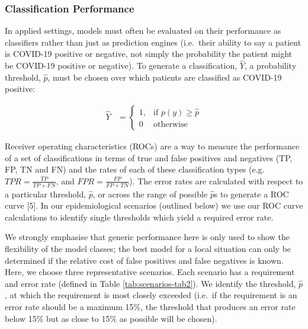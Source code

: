 \documentclass[]{elsarticle} %
\begin{document}
\hypertarget{classification-performance}{%
\subsubsection{Classification Performance}\label{classification-performance}}

In applied settings, models must often be evaluated on their performance as classifiers rather than just as prediction engines (i.e.~their ability to say a patient is COVID-19 positive or negative, not simply the probability the patient might be COVID-19 positive or negative).
To generate a classification, \(\hat{Y}\), a probability threshold, \(\hat{p}\), must be chosen over which patients are classified as COVID-19 positive:

\begin{equation}\begin{aligned}
\hat{Y} &= \begin{cases}
    1,& \text{if } p(y) \geq \hat{p} \\
     0  & \text{otherwise}
\end{cases}
\label{eq:ClassificationThreshold}
\end{aligned}\end{equation}\ignorespacesafterend

Receiver operating characteristics (ROCs) are a way to measure the performance of a set of classifications in terms of true and false positives and negatives (TP, FP, TN and FN) and the rates of each of these classification types (e.g.~\(TPR = \frac{TP}{TP+FN}\), and \(FPR = \frac{FP}{FP+TN}\)).
The error rates are calculated with respect to a particular threshold, \(\hat{p}\), or across the range of possible \(\hat{p}\)s to generate a ROC curve {[}5{]}.
In our epidemiological scenarios (outlined below) we use our ROC curve calculations to identify single thresholds which yield a required error rate.

We strongly emphasise that generic performance here is only used to show the flexibility of the model classes; the best model for a local situation can only be determined if the relative cost of false positives and false negatives is known.
Here, we choose three representative scenarios.
Each scenario has a requirement and error rate (defined in Table \ref{tab:scenarios-tab2}).
We identify the threshold, \(\hat{p}\), at which the requirement is most closely exceeded (i.e.~if the requirement is an error rate should be a maximum 15\%, the threshold that produces an error rate below 15\% but as close to 15\% as possible will be chosen).
\end{document}
